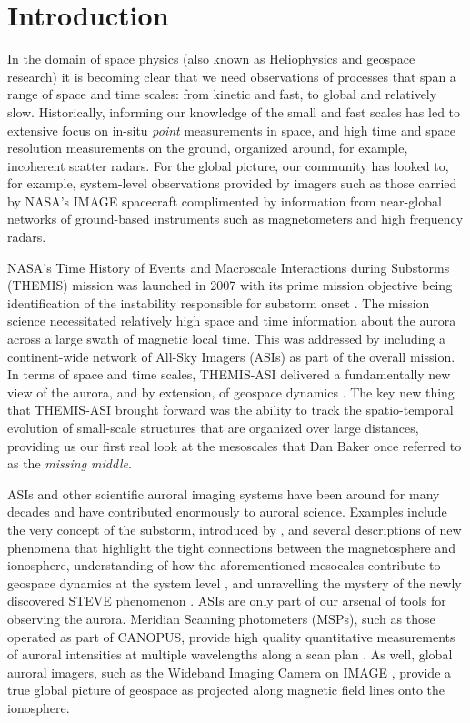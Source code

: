 \documentclass[utf8]{FrontiersinHarvard} %
\begin{document}
\section{Introduction}\label{intro}
In the domain of space physics (also known as Heliophysics and geospace research) it is becoming clear that we need observations of processes that span a range of space and time scales: from kinetic and fast, to global and relatively slow. Historically, informing our knowledge of the small and fast scales has led to extensive focus on in-situ \textit{point} measurements in space, and high time and space resolution measurements on the ground, organized around, for example, incoherent scatter radars. For the global picture, our community has looked to, for example, system-level observations provided by imagers such as those carried by NASA's IMAGE spacecraft \citep{Burch2000} complimented by information from near-global networks of ground-based instruments such as magnetometers and high frequency radars.

NASA's Time History of Events and Macroscale Interactions during Substorms (THEMIS) mission was launched in 2007 with its prime mission objective being identification of the instability responsible for substorm onset \cite[e.g.][]{Angelopoulos2008}. The mission science necessitated relatively high space and time information about the aurora across a large swath of magnetic local time. This was addressed by including a continent-wide network of All-Sky Imagers (ASIs) as part of the overall mission. In terms of space and time scales, THEMIS-ASI delivered a fundamentally new view of the aurora, and by extension, of geospace dynamics \cite[e.g.][]{Donovan2006a, Mende2009, Jones2013}. The key new thing that THEMIS-ASI brought forward was the ability to track the spatio-temporal evolution of small-scale structures that are organized over large distances, providing us our first real look at the mesoscales that Dan Baker once referred to as the \textit{missing middle}.

ASIs and other scientific auroral imaging systems have been around for many decades and have contributed enormously to auroral science. Examples include the very concept of the substorm, introduced by \citet{Akasofu1964}, and several descriptions of new phenomena that highlight the tight connections between the magnetosphere and ionosphere, understanding of how the aforementioned mesocales contribute to geospace dynamics at the system level \citep{Nishimura2010}, and unravelling the mystery of the newly discovered STEVE phenomenon \citep{Macdonald2018}. ASIs are only part of our arsenal of tools for observing the aurora. Meridian Scanning photometers (MSPs), such as those operated as part of CANOPUS, provide high quality quantitative measurements of auroral intensities at multiple wavelengths along a scan plan \citep[e.g.][]{Rostoker1995}. As well, global auroral imagers, such as the Wideband Imaging Camera on IMAGE \citep{Burch2000}, provide a true global picture of geospace as projected along magnetic field lines onto the ionosphere.
\end{document}
